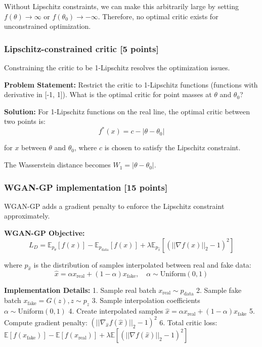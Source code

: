 \documentclass{article}
\begin{document}
Without Lipschitz constraints, we can make this arbitrarily large by setting $f(\theta) \to \infty$ or $f(\theta_0) \to -\infty$. Therefore, no optimal critic exists for unconstrained optimization.

\subsubsection{Lipschitz-constrained critic [5 points]}

Constraining the critic to be 1-Lipschitz resolves the optimization issues.

\textbf{Problem Statement:} Restrict the critic to 1-Lipschitz functions (functions with derivative in [-1, 1]). What is the optimal critic for point masses at $\theta$ and $\theta_0$?

\textbf{Solution:} For 1-Lipschitz functions on the real line, the optimal critic between two points is:
\[
f^*(x) = c - |\theta - \theta_0|
\]

for $x$ between $\theta$ and $\theta_0$, where $c$ is chosen to satisfy the Lipschitz constraint.

The Wasserstein distance becomes $W_1 = |\theta - \theta_0|$.

\subsubsection{WGAN-GP implementation [15 points]}

WGAN-GP adds a gradient penalty to enforce the Lipschitz constraint approximately.

\textbf{WGAN-GP Objective:}
\[
L_D = \mathbb{E}_{p_\theta}[f(x)] - \mathbb{E}_{p_{\text{data}}}[f(x)] + \lambda \mathbb{E}_{p_{\hat{x}}} [(||\nabla f(x)||_2 - 1)^2]
\]

where $p_{\hat{x}}$ is the distribution of samples interpolated between real and fake data:
\[
\hat{x} = \alpha x_{\text{real}} + (1 - \alpha) x_{\text{fake}}, \quad \alpha \sim \text{Uniform}(0,1)
\]

\textbf{Implementation Details:}
1. Sample real batch $x_{\text{real}} \sim p_{\text{data}}$
2. Sample fake batch $x_{\text{fake}} = G(z), z \sim p_z$
3. Sample interpolation coefficients $\alpha \sim \text{Uniform}(0,1)$
4. Create interpolated samples $\hat{x} = \alpha x_{\text{real}} + (1 - \alpha) x_{\text{fake}}$
5. Compute gradient penalty: $(||\nabla_\hat{x} f(\hat{x})||_2 - 1)^2$
6. Total critic loss: $\mathbb{E}[f(x_{\text{fake}})] - \mathbb{E}[f(x_{\text{real}})] + \lambda \mathbb{E}[(||\nabla f(\hat{x})||_2 - 1)^2]$
\end{document}
